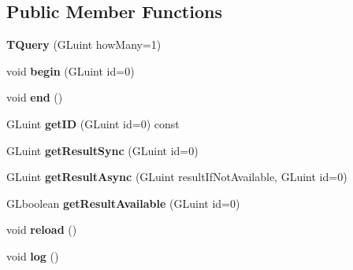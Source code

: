 \subsection*{Public Member Functions}
\begin{DoxyCompactItemize}
\item 
{\bfseries T\+Query} (G\+Luint how\+Many=1)\hypertarget{classflw_1_1flc_1_1TQuery_a2844cb4f9c0c3cd79a1b2031d39a0cb3}{}\label{classflw_1_1flc_1_1TQuery_a2844cb4f9c0c3cd79a1b2031d39a0cb3}

\item 
void {\bfseries begin} (G\+Luint id=0)\hypertarget{classflw_1_1flc_1_1TQuery_a7525585ac205bd88a21134c31ea16db2}{}\label{classflw_1_1flc_1_1TQuery_a7525585ac205bd88a21134c31ea16db2}

\item 
void {\bfseries end} ()\hypertarget{classflw_1_1flc_1_1TQuery_abe2be94820765c6133c46b2f537a6109}{}\label{classflw_1_1flc_1_1TQuery_abe2be94820765c6133c46b2f537a6109}

\item 
G\+Luint {\bfseries get\+ID} (G\+Luint id=0) const \hypertarget{classflw_1_1flc_1_1TQuery_a1086d5ee316dd5bbb24723493f8a366b}{}\label{classflw_1_1flc_1_1TQuery_a1086d5ee316dd5bbb24723493f8a366b}

\item 
G\+Luint {\bfseries get\+Result\+Sync} (G\+Luint id=0)\hypertarget{classflw_1_1flc_1_1TQuery_ac71e1fedd510f52d11fd19ab53bd2ab7}{}\label{classflw_1_1flc_1_1TQuery_ac71e1fedd510f52d11fd19ab53bd2ab7}

\item 
G\+Luint {\bfseries get\+Result\+Async} (G\+Luint result\+If\+Not\+Available, G\+Luint id=0)\hypertarget{classflw_1_1flc_1_1TQuery_a476771526b027991b45d3459a6fb4bcc}{}\label{classflw_1_1flc_1_1TQuery_a476771526b027991b45d3459a6fb4bcc}

\item 
G\+Lboolean {\bfseries get\+Result\+Available} (G\+Luint id=0)\hypertarget{classflw_1_1flc_1_1TQuery_aad811849ae8d5af1a871bfbb8ddf6f0d}{}\label{classflw_1_1flc_1_1TQuery_aad811849ae8d5af1a871bfbb8ddf6f0d}

\item 
void {\bfseries reload} ()\hypertarget{classflw_1_1flc_1_1TQuery_ac76abc32cda4f70f4b8e97f418b87cd3}{}\label{classflw_1_1flc_1_1TQuery_ac76abc32cda4f70f4b8e97f418b87cd3}

\item 
void {\bfseries log} ()\hypertarget{classflw_1_1flc_1_1TQuery_aacf97c5ed0e67321a32723fe5fdd443d}{}\label{classflw_1_1flc_1_1TQuery_aacf97c5ed0e67321a32723fe5fdd443d}

\end{DoxyCompactItemize}
